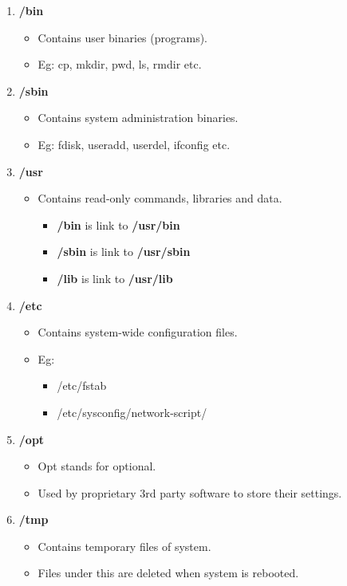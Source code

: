 \begin{flushleft}
\begin{enumerate}
\begin{itemize}
		\end{itemize}
		\item \textbf{/bin}
		\begin{itemize}
			\item Contains user binaries (programs).
			\item Eg: cp, mkdir, pwd, ls, rmdir etc.
		\end{itemize}
		\item \textbf{/sbin}
		\begin{itemize}
			\item Contains system administration binaries.
			\item Eg: fdisk, useradd, userdel, ifconfig etc.
		\end{itemize}
	\newpage
		\item \textbf{/usr}
		\begin{itemize}
			\item Contains read-only commands, libraries and data.
			\begin{itemize}
				\item \textbf{/bin} is link to \textbf{/usr/bin}
				\item \textbf{/sbin} is link to \textbf{/usr/sbin}
				\item \textbf{/lib} is link to \textbf{/usr/lib}
			\end{itemize}
		\end{itemize}
		\item \textbf{/etc}
		\begin{itemize}
			\item Contains system-wide configuration files.
			\item Eg: 
			\begin{itemize}
				\item /etc/fstab
				\item /etc/sysconfig/network-script/
			\end{itemize}
		\end{itemize}
			\item \textbf{/opt}
			\begin{itemize}
				\item Opt stands for optional.
				\item Used by proprietary 3rd party software to store their settings.
			\end{itemize}
		\item \textbf{/tmp}
		\begin{itemize}
			\item Contains temporary files of system.
			\item Files under this are deleted when system is rebooted.

\end{itemize}
\end{enumerate}
\end{flushleft}

